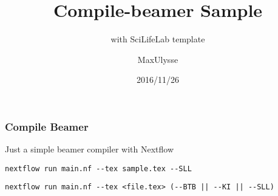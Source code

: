 \documentclass{beamer}
\title{Compile-beamer Sample}
\subtitle{with SciLifeLab template}
\author{MaxUlysse}
\institute{Barntumörbanken / SciLifeLab}
\date{2016/11/26}
\begin{document}
	\begin{frame}
		\titlepage
	\end{frame}

	\begin{frame}[fragile]
		\frametitle{Compile Beamer}
		Just a simple beamer compiler with Nextflow
		\begin{lstlisting}[title=Usage]
			nextflow run main.nf --tex sample.tex --SLL
		\end{lstlisting}
		\begin{lstlisting}[title=This file was made using]
			nextflow run main.nf --tex <file.tex> (--BTB || --KI || --SLL)
		\end{lstlisting}
	\end{frame}
\end{document}
